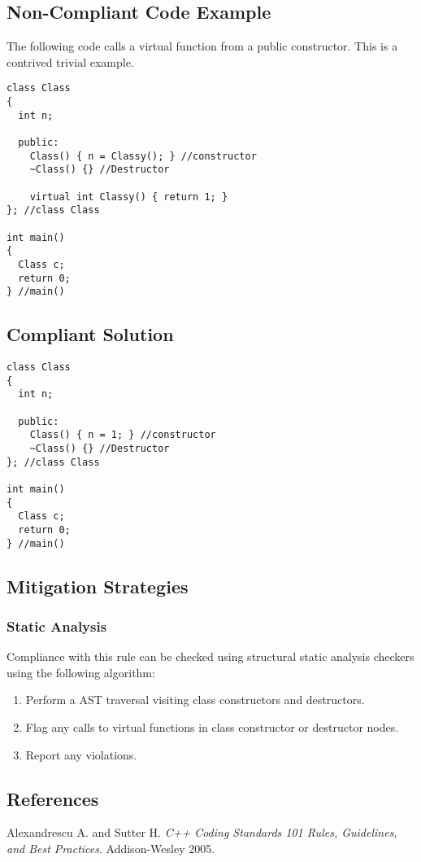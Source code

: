 \subsection{Non-Compliant Code Example}
The following code calls a virtual function from a public constructor. This is
a contrived trivial example.

\begin{verbatim}
class Class
{
  int n;

  public:
    Class() { n = Classy(); } //constructor
    ~Class() {} //Destructor

    virtual int Classy() { return 1; }
}; //class Class

int main()
{
  Class c;
  return 0;
} //main()
\end{verbatim}

\subsection{Compliant Solution}

\begin{verbatim}
class Class
{
  int n;

  public:
    Class() { n = 1; } //constructor
    ~Class() {} //Destructor
}; //class Class

int main()
{
  Class c;
  return 0;
} //main()
\end{verbatim}

\subsection{Mitigation Strategies}
\subsubsection{Static Analysis} 

Compliance with this rule can be checked using structural static analysis checkers using the following algorithm:

\begin{enumerate}
\item Perform a AST traversal visiting class constructors and destructors.
\item Flag any calls to virtual functions in class constructor or destructor nodes.
\item Report any violations. 
\end{enumerate}

\subsection{References}

Alexandrescu A. and Sutter H. {\it C++ Coding Standards 101 Rules, Guidelines, and Best Practices}. Addison-Wesley 2005.
